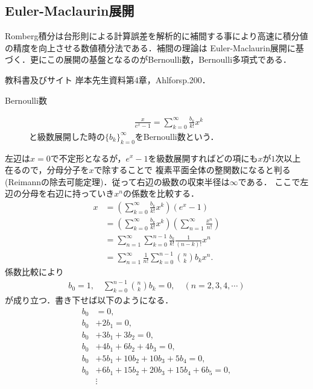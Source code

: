\documentclass[a4j,papersize,disablejfam,slide,14pt]{jsarticle}
\def\exp#1{e^{#1}} %
\begin{document}
\subsection{{\rm Euler-Maclaurin}展開}
	{\rm Romberg}積分は台形則による計算誤差を解析的に補間する事により高速に積分値の精度を向上させる数値積分法である．補間の理論は
    {\rm Euler-Maclaurin}展開に基づく．更にこの展開の基盤となるのが{\rm Bernoulli}数，{\rm Bernoulli}多項式である．
    \begin{itembox}[l]{教科書及びサイト}
    	{\rm 岸本先生資料\cite{kishimoto_real_analysis}第4章，{\rm Ahlfors}\cite{ahlfors_complex}p.200．}
    \end{itembox}
    \begin{screen}
    	\begin{description}
        	\item[{\rm Bernoulli}数]
            \begin{align}
            	\frac{x}{\exp{x}-1} = \sum_{k=0}^{\infty} \frac{b_k}{k!} x^k
            \end{align}
            と級数展開した時の$\{b_k\}_{k=0}^{\infty}$を{\rm Bernoulli}数という．
        \end{description}
    \end{screen}
    左辺は$x=0$で不定形となるが，$\exp{x}-1$を級数展開すればどの項にも$x$が$1$次以上在るので，分母分子を$x$で除することで
    複素平面全体の整関数になると判る({\rm Reimann}の除去可能定理)．従って右辺の級数の収束半径は$\infty$である．
    ここで左辺の分母を右辺に持っていき$x^n$の係数を比較する．
    \begin{align}
    	x &= \left( \sum_{k=0}^{\infty} \frac{b_k}{k!} x^k \right) (\exp{x}-1) \\
        &= \left( \sum_{k=0}^{\infty} \frac{b_k}{k!} x^k \right) \left( \sum_{n=1}^{\infty} \frac{x^n}{n!} \right) \\
        &= \sum_{n=1}^{\infty} \sum_{k=0}^{n-1} \frac{b_k}{k!}\frac{1}{(n-k)!} x^n \\
        &= \sum_{n=1}^{\infty} \frac{1}{n!} \sum_{k=0}^{n-1} \binom{n}{k} b_k x^n.
    \end{align}
    係数比較により
    \begin{align}
    	b_0=1, \quad \sum_{k=0}^{n-1} \binom{n}{k} b_k = 0, \quad (n=2,3,4,\cdots)
    \end{align}
    が成り立つ．書き下せば以下のようになる．
    \begin{align}
    	b_0 &= 0, \\
        b_0 &+ 2b_1 = 0, \\
        b_0 &+ 3b_1 + 3b_2 = 0, \\
        b_0 &+ 4b_1 + 6b_2 + 4b_3 = 0, \\
        b_0 &+ 5b_1 + 10b_2 + 10b_3 + 5b_4 = 0, \\
        b_0 &+ 6b_1 + 15b_2 + 20b_3 + 15b_4 + 6b_5 = 0, \\
        &\vdots
    \end{align}
\end{document}
